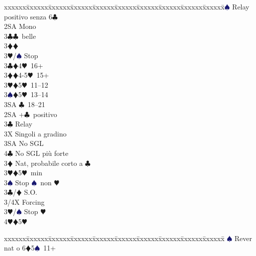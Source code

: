 \documentclass[a4paper,italian]{article}
\newcommand{\BC}{\textcolor{OliveGreen}{$\clubsuit$}}
\newcommand{\BD}{\textcolor{RedOrange}{$\vardiamondsuit$}}
\newcommand{\BH}{\textcolor{Red2}{$\varheartsuit${}}}
\newcommand{\BS}{\textcolor{MidnightBlue}{$\spadesuit${}}}
\newenvironment{bidtable}
{\begin{tabbing}

    xxxxxx\=xxxxxx\=xxxxxx\=xxxxxx\=xxxxxx\=xxxxxx\=xxxxxx\=xxxxxx\=xxxxxx\=xxxxxx\=\kill}
{\end{tabbing} }%
\begin{document}
\begin{multicols}{2}
\begin{bidtable}
                                            2\BS \> Relay positivo senza 6\BC \+\\
                                            2SA \> Mono\+\\
                                            3\BC {}\BC\ belle\\
                                            3\BD {}\BD \\
                                            3\BH/\BS \> Stop\-\\
                                            3\BC {}\BD 4\BH\ 16+\\
                                            3\BD {}\BD 4-5\BH\ 15+\\
                                            3\BH {}\BD 5\BH\ 11--12\\
                                            3\BS {}\BD 5\BH\ 13--14\\
                                            3SA \BC\ 18--21\-\\
                                            2SA +\BC\ positivo\+\\
                                            3\BC \> Relay\+\\
                                            3X \> Singoli a gradino\\
                                            3SA \> No SGL\\
                                            4\BC \> No SGL più forte\-\\
                                            3\BD \> Nat, probabile corto a \BC \\
                                            3\BH {}\BD 5\BH\ min\\
                                            3\BS \> Stop \BS\ non \BH \-\\
                                            3\BC/\BD \> S.O.\+\\
                                            3/4X \> Forcing\\
                                            3\BH/\BS \> Stop \BH \\
                                            4\BH {}\BD 5\BH \-\-\\
\end{bidtable}
\columnbreak
\begin{bidtable}                                            
\BS \> Rever nat o 6\BD 5\BS\ 11+\+\+\\

\end{bidtable}
\end{multicols}
\end{document}

